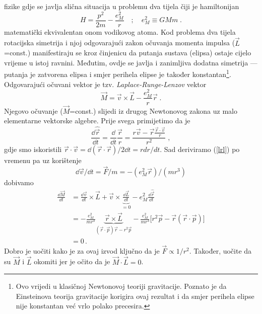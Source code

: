 fizike gdje se javlja slična situacija u problemu dva tijela čiji
je hamiltonijan
\begin{equation}
    H = \frac{p^2}{2m} - \frac{e_{M}^2}{r} \quad ; \quad 
 e_{M}^2 \equiv G M m \;.
\end{equation}
matematički ekvivalentan onom vodikovog atoma.
Kod problema dva tijela rotacijska simetrija i njoj odgovarajući zakon
očuvanja momenta impulsa ($\vec{L}$=const.) manifestiraju se kroz
činjenicu da putanja sustava (elipsa) ostaje cijelo vrijeme u istoj
ravnini.  Međutim, ovdje se javlja i zanimljiva dodatna simetrija ---
putanja je zatvorena elipsa i
smjer perihela elipse je također konstantan\footnote{Ovo
vrijedi u klasičnoj Newtonovoj teoriji gravitacije. Poznato je da
Einsteinova teorija gravitacije korigira ovaj rezultat i da smjer perihela
elipse nije konstantan već vrlo polako precesira.}.
Odgovarajući očuvani vektor je tzv. \emph{Laplace-Runge-Lenzov}
vektor
\begin{equation}
  \vec{M} = \vec{v}\times\vec{L} - \frac{e_{M}^2}{r}\vec{r} \;.
\label{lrl}
\end{equation}
Njegovo očuvanje ($\vec{M}$=const.) slijedi iz drugog Newtonovog
zakona uz malo elementarne vektorske algebre.
Prije svega primijetimo da je
\begin{displaymath}
 \frac{\dd \hat{\vec{r}}}{\dd t} = \frac{\dd}{\dd t} \frac{\vec{r}}{r} =
 \frac{r \vec{v} - \vec{r}
\frac{\vec{r}\cdot\vec{v}}{r}}{r^2} \;,
\end{displaymath}
gdje smo iskoristili $\vec{r}\cdot\vec{v} = \dd (\vec{r}\cdot\vec{r})/2\dd t
= r dr/dt $.
Sad deriviramo (\ref{lrl}) po vremenu pa uz korištenje 
\[ \dd \vec{v}/ \dd t = \vec{F}/m = - (e_{M}^2 \vec{r})/(mr^3) \]
dobivamo
\begin{displaymath}
\begin{split}
\frac{\dd \vec{M}}{\dd t} &=
\frac{\dd \vec{v}}{\dd t} \times \vec{L} + \vec{v}\times
\underbrace{\frac{\dd \vec{L}}{\dd t}}_{=0} - e_{M}^2 \frac{\dd \hat{\vec{r}}}
{\dd t} \\
&= -\frac{e_{M}^2}{mr^3} \underbrace{\vec{r}\times\vec{L}}_{(\vec{r}\cdot 
\vec{p})\vec{r} - r^2 \vec{p}} -
    \frac{e_{M}^2}{mr^3} \Big[ r^2\vec{p} - \vec{r}(\vec{r}\cdot\vec{p})\Big] \\
&= 0 \,.
\end{split}
\end{displaymath}
Dobro je uočiti kako je za ovaj izvod ključno da je $\vec{F}\propto 1/r^2$.
Također, uočite da su $\vec{M}$ i $\vec{L}$ okomiti jer je očito da je
$\vec{M}\cdot\vec{L}=0$.
